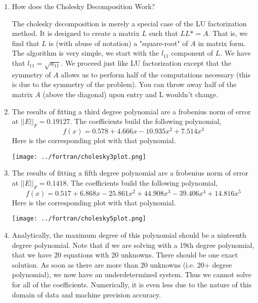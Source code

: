 \documentclass{article}
\begin{document}
\begin{enumerate}
\item How does the Cholesky Decomposition Work?

The cholesky decomposition is merely a special case of the LU factorization method. It is designed to create a matrix $L$ such that $LL* = A$. That is, we find that $L$ is (with abuse of notation) a "square-root" of $A$ in matrix form. The algorithm is very simple, we start with the $l_{11}$ component of $L$. We have that $l_{11} = \sqrt{a_{11}}$. We proceed just like LU factorization except that the symmetry of $A$ allows us to perform half of the computations necessary (this is due to the symmetry of the problem). You can throw away half of the matrix $A$ (above the diagonal) upon entry and L wouldn't change. 

\item The results of fitting a third degree polynomial are a frobenius norm of error at $||E||_F = 0.19127$. The coefficients build the following polynomial, 
    \[
        f(x) = 0.578 + 4.666x - 10.935 x^2 + 7.514x^3
    \]
    Here is the corresponding plot with that polynomial. 
    
        \centering
        \texttt{[image: ../fortran/cholesky3plot.png]}
    \emp

\item The results of fitting a fifth degree polynomial are a frobenius norm of error at $||E||_F = 0.1418$. The coefficients build the following polynomial, 
    \[
        f(x) = 0.517 + 6.868x - 25.861x^2 + 44.908x^3 - 39.406x^4 + 14.816x^5
    \]
    Here is the corresponding plot with that polynomial. 
    
        \centering
        \texttt{[image: ../fortran/cholesky5plot.png]}
    \emp

\item Analytically, the maximum degree of this polynomial should be a ninteenth degree polynomial. Note that if we are solving with a 19th degree polynomial, that we have 20 equations with 20 unknowns. There should be one exact solution. As soon as there are more than 20 unknowns (i.e. 20+ degree polynomial), we now have an underdetermined system. Thus we cannot solve for all of the coefficients. Numerically, it is even less due to the nature of this domain of data and machine precision accuracy.


\end{enumerate}
\end{document}

